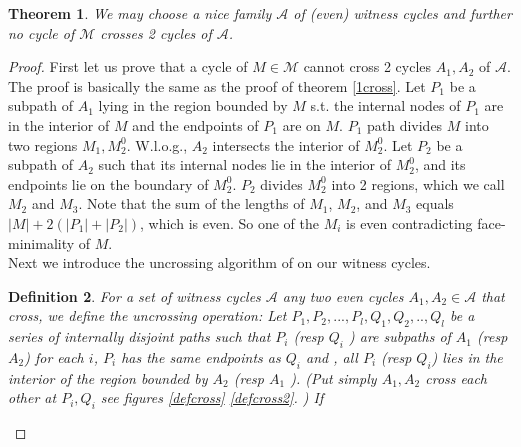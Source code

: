 \documentclass[letterpaper,11pt]{article}
\newtheorem{theorem}{Theorem}[section]
\newtheorem{definition}[theorem]{Definition}
\newcommand{\0}{\mathbb{0}}
\newcommand{\1}{\mathbb{1}}
\begin{document}
\begin{theorem} \label{laminar witness}
We may choose a nice family $\mathcal{A}$ of  (even) witness cycles and further no cycle of $\mathcal{M}$ crosses 2 cycles of $\mathcal{A}$.
\end{theorem} 
\begin{proof}
First let us prove that a cycle of $M \in \mathcal{M} $ cannot cross 2 cycles $A_1 , A_2$ of $\mathcal{A}  $. The proof is basically the same as the proof of theorem \ref{1cross}. Let $P_1$ 
be a subpath of $A_1$ 
lying in the region bounded by $M$ s.t. the internal nodes of $P_1$ are in the interior of $M$ and the endpoints of $P_1$ are on $M$. $P_1$ path divides $M$ into two regions $M_1, M^0_2 $. W.l.o.g.,  $A_2$ intersects the interior of $M^0_2$. Let $P_2$ be a subpath of $A_2$ such that its internal nodes lie in the interior of $M^0_2$, and its endpoints lie on the boundary of $M^0_2$.  $P_2$ divides $M^0_2$ into 2 regions, which we call $M_2$ and $M_3$. Note that the sum of the lengths of $M_1$, $M_2$, and $M_3$ equals $|M| +2(|P_1|+|P_2|)$, which is even. So one of the $M_i$ is even contradicting face-minimality of $M$.\\
%
Next we introduce the uncrossing algorithm of \cite{GW98} on our witness cycles. %
\begin{definition}\label{uncrossing} \cite{GW98}
For  a set of witness cycles $ \mathcal{A} $ any two even cycles $A_1, A_2 \in \mathcal{A}$  that cross, we define the uncrossing operation: Let  $P_1, P_2 ,..., P_l ,Q_1, Q_2, .., Q_l$ be a series of internally disjoint paths such that $P_i$ (resp $Q_i$ )  are subpaths of $A_1$ (resp $A_2$)  for each $i$,  $P_i$ has the same endpoints as  $Q_i$  and , all $P_i$ (resp $Q_i$) lies in the interior of the region bounded by $A_2$ (resp $A_1$  ).  (Put simply $A_1 , A_2 $ cross each other at $P_i, Q_i $ see figures \ref{defcross} \ref{defcross2}. ) If 

\end{definition}
\end{proof}
\end{document}
